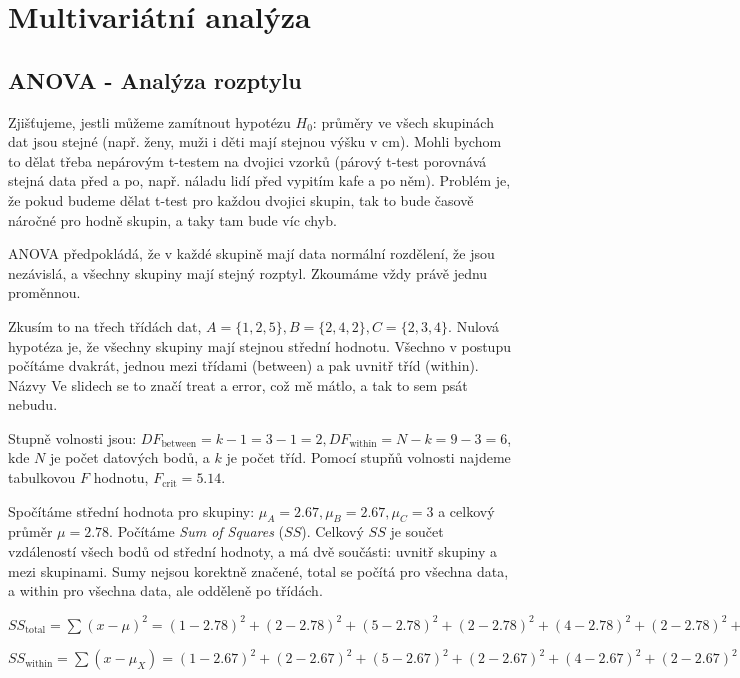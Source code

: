 \section{Multivariátní analýza}

\subsection{ANOVA - Analýza rozptylu}

Zjišťujeme, jestli můžeme zamítnout hypotézu $H_0$: průměry ve všech skupinách dat jsou stejné (např. ženy, muži i děti mají stejnou výšku v cm). Mohli bychom to dělat třeba nepárovým t-testem na dvojici vzorků (párový t-test porovnává stejná data před a po, např. náladu lidí před vypitím kafe a po něm). Problém je, že pokud budeme dělat t-test pro každou dvojici skupin, tak to bude časově náročné pro hodně skupin, a taky tam bude víc chyb.

ANOVA předpokládá, že v každé skupině mají data normální rozdělení, že jsou nezávislá, a všechny skupiny mají stejný rozptyl. Zkoumáme vždy právě jednu proměnnou.

Zkusím to na třech třídách dat, $A = \{1, 2, 5\}, B = \{2, 4, 2\}, C = \{2, 3, 4\}$. Nulová hypotéza je, že všechny skupiny mají stejnou střední hodnotu. Všechno v postupu počítáme dvakrát, jednou mezi třídami (between) a pak uvnitř tříd (within). Názvy Ve slidech se to značí treat a error, což mě mátlo, a tak to sem psát nebudu.

Stupně volnosti jsou: $DF_{\text{between}} = k - 1 = 3-1 = 2, DF_{\text{within}} = N - k = 9 - 3 = 6$, kde $N$ je počet datových bodů, a $k$ je počet tříd. Pomocí stupňů volnosti najdeme tabulkovou $F$ hodnotu, $F_{\text{crit}} = 5.14$.

Spočítáme střední hodnota pro skupiny: $\mu_A=2.67,\mu_B=2.67,\mu_C=3$ a celkový průměr $\mu=2.78$. Počítáme \textit{Sum of Squares} ($SS$). Celkový $SS$ je součet vzdáleností všech bodů od střední hodnoty, a má dvě součásti: uvnitř skupiny a mezi skupinami. Sumy nejsou korektně značené, total se počítá pro všechna data, a within pro všechna data, ale odděleně po třídách.

\noindent $SS_\text{total} = \sum (x - \mu)^2 = (1-2.78)^2 + (2-2.78)^2 + (5-2.78)^2 + (2-2.78)^2 + (4-2.78)^2 + (2-2.78)^2 + (2-2.78)^2 + (3-2.78)^2 + (4-2.78)^2  = 13.6$

\noindent $SS_\text{within} = \sum (x - \mu_X) = (1-2.67)^2 + (2-2.67)^2 + (5-2.67)^2 + (2-2.67)^2 + (4-2.67)^2 + (2-2.67)^2 + (2-3)^2 + (3-3)^2 + (3-4)^2 = 13.34$

